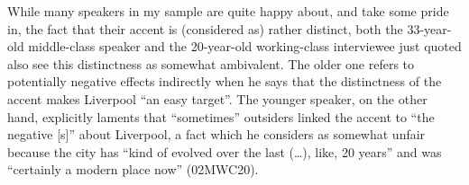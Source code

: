 While many speakers in my sample are quite happy about, and take some pride in, the fact that their accent is (considered as) rather distinct, both the 33-year-old middle-class speaker and the 20-year-old working-class interviewee just quoted also see this distinctness as somewhat ambivalent.
The older one refers to potentially negative effects indirectly when he says that the distinctness of the accent makes Liverpool ``an easy target''.
The younger speaker, on the other hand, explicitly laments that ``sometimes'' outsiders linked the accent to ``the negative [s]'' about Liverpool, a fact which he considers as somewhat unfair because the city has ``kind of evolved over the last (\ldots), like, 20 years'' and was ``certainly a modern place now'' (02MWC20).

